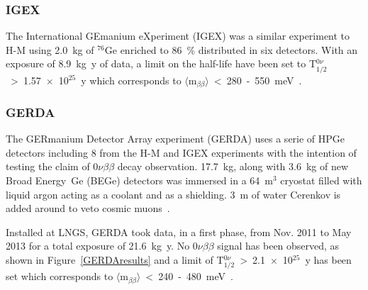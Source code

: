 \documentclass[main.tex]{subfiles}
\begin{document}
\FloatBarrier

\subsubsection{IGEX}


\NI The International GEmanium eXperiment (IGEX) was a similar experiment to H-M using 2.0~kg of $^{\text{76}}$Ge enriched to 86~\% distributed in six detectors. With an exposure of 8.9~kg~y of data, a limit on the half-life have been set to T$_{\text{1/2}}^{0\nu}$~>~1.57~$\times$~10$^{\text{25}}$~y which corresponds to $\langle \text{m}_{\beta\beta} \rangle$~<~280~-~550~meV~\cite{IGEX}.


\subsubsection{GERDA}


\NI The GERmanium Detector Array experiment (GERDA) uses a serie of HPGe detectors including 8 from the H-M and IGEX experiments with the intention of testing the claim of 0$\nu\beta\beta$ decay observation. 17.7~kg, along with 3.6~kg of new Broad Energy~Ge (BEGe) detectors was immersed in a 64~m$^\text{3}$ cryostat filled with liquid argon acting as a coolant and as a shielding. 3~m of water Cerenkov is added around to veto cosmic muons~\cite{GERDA}.


\bigskip 


\NI Installed at LNGS, GERDA took data, in a first phase, from Nov. 2011 to May 2013 for a total exposure of 21.6~kg~y. No 0$\nu\beta\beta$ signal has been observed, as shown in Figure~\ref{GERDAresults} and a limit of T$_{\text{1/2}}^{0\nu}$~>~2.1~$\times$~10$^{\text{25}}$~y has been set which corresponds to $\langle \text{m}_{\beta\beta} \rangle$~<~240~-~480~meV~\cite{GERDA}.
\end{document}
